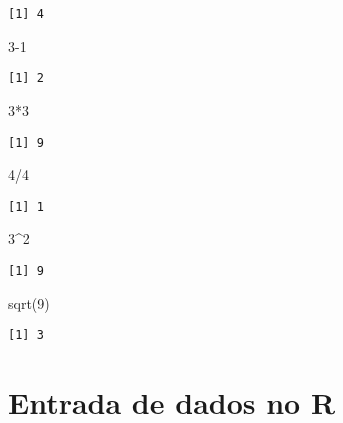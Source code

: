 \documentclass[
  letterpaper,
  DIV=11,
  numbers=noendperiod]{scrreprt}
\newenvironment{Shaded}{\begin{snugshade}}{\end{snugshade}}
\newcommand{\DecValTok}[1]{\textcolor[rgb]{0.68,0.00,0.00}{#1}}
\newcommand{\FunctionTok}[1]{\textcolor[rgb]{0.28,0.35,0.67}{#1}}
\newcommand{\NormalTok}[1]{\textcolor[rgb]{0.00,0.23,0.31}{#1}}
\newcommand{\SpecialCharTok}[1]{\textcolor[rgb]{0.37,0.37,0.37}{#1}}
\begin{document}
\begin{verbatim}
[1] 4
\end{verbatim}

\begin{Shaded}
\begin{Highlighting}[]
\DecValTok{3{-}1}
\end{Highlighting}
\end{Shaded}

\begin{verbatim}
[1] 2
\end{verbatim}

\begin{Shaded}
\begin{Highlighting}[]
\DecValTok{3}\SpecialCharTok{*}\DecValTok{3}
\end{Highlighting}
\end{Shaded}

\begin{verbatim}
[1] 9
\end{verbatim}

\begin{Shaded}
\begin{Highlighting}[]
\DecValTok{4}\SpecialCharTok{/}\DecValTok{4}
\end{Highlighting}
\end{Shaded}

\begin{verbatim}
[1] 1
\end{verbatim}

\begin{Shaded}
\begin{Highlighting}[]
\DecValTok{3}\SpecialCharTok{\^{}}\DecValTok{2}
\end{Highlighting}
\end{Shaded}

\begin{verbatim}
[1] 9
\end{verbatim}

\begin{Shaded}
\begin{Highlighting}[]
\FunctionTok{sqrt}\NormalTok{(}\DecValTok{9}\NormalTok{)}
\end{Highlighting}
\end{Shaded}

\begin{verbatim}
[1] 3
\end{verbatim}


\chapter{Entrada de dados no R}\label{entrada-de-dados-no-r}
\end{document}
